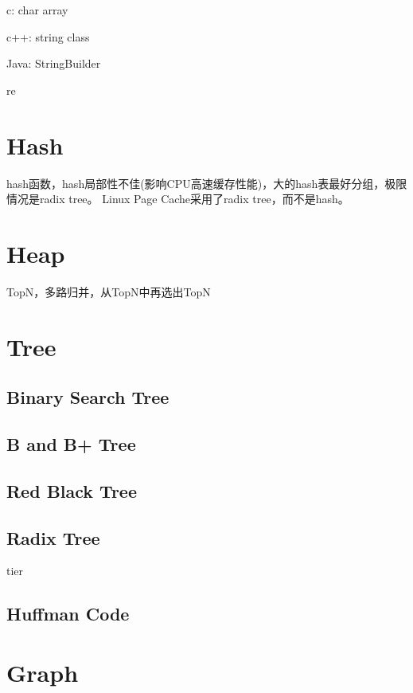 \begin{enumbox}
\item c: char array
\item c++: string class
\item Java: StringBuilder
\item re
\end{enumbox}
\section{Hash}

hash函数，hash局部性不佳(影响CPU高速缓存性能)，大的hash表最好分组，极限情况是radix tree。
Linux Page Cache采用了radix tree，而不是hash。

\section{Heap}

TopN，多路归并，从TopN中再选出TopN

\section{Tree}

\subsection{Binary Search Tree}

\subsection{B and B+ Tree}

\subsection{Red Black Tree}

\subsection{Radix Tree}

tier

\subsection{Huffman Code}

\section{Graph}

